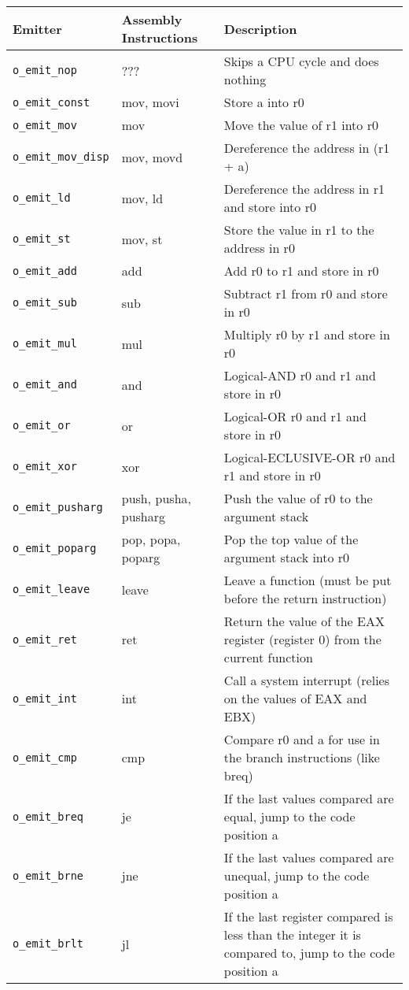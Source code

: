 \documentclass[10pt,a4paper]{article}
\begin{document}
{\footnotesize
\begin{tabular}{l l p{10cm}}
\hline
Emitter & Assembly Instructions & Description \\
\hline
\verb|o_emit_nop| & ??? & Skips a CPU cycle and does nothing \\
\verb|o_emit_const| & mov, movi & Store a into r0 \\
\verb|o_emit_mov| & mov & Move the value of r1 into r0 \\
\verb|o_emit_mov_disp| & mov, movd & Dereference the address in (r1 + a) \\
\verb|o_emit_ld| & mov, ld & Dereference the address in r1 and store into r0 \\
\verb|o_emit_st| & mov, st & Store the value in r1 to the address in r0 \\
\verb|o_emit_add| & add & Add r0 to r1 and store in r0 \\
\verb|o_emit_sub| & sub & Subtract r1 from r0 and store in r0 \\
\verb|o_emit_mul| & mul & Multiply r0 by r1 and store in r0 \\
\verb|o_emit_and| & and & Logical-AND r0 and r1 and store in r0 \\
\verb|o_emit_or| & or & Logical-OR r0 and r1 and store in r0 \\
\verb|o_emit_xor| & xor & Logical-ECLUSIVE-OR r0 and r1 and store in r0 \\
\verb|o_emit_pusharg| & push, pusha, pusharg & Push the value of r0 to the argument stack \\
\verb|o_emit_poparg| & pop, popa, poparg & Pop the top value of the argument stack into r0 \\
\verb|o_emit_leave| & leave & Leave a function (must be put before the return instruction) \\
\verb|o_emit_ret| & ret & Return the value of the EAX register (register 0) from the current function \\
\verb|o_emit_int| & int & Call a system interrupt (relies on the values of EAX and EBX) \\
\verb|o_emit_cmp| & cmp & Compare r0 and a for use in the branch instructions (like breq) \\
\verb|o_emit_breq| & je & If the last values compared are equal, jump to the code position a \\
\verb|o_emit_brne| & jne & If the last values compared are unequal, jump to the code position a \\
\verb|o_emit_brlt| & jl & If the last register compared is less than the integer it is compared to, jump to the code position a \\

\end{tabular}}
\end{document}
